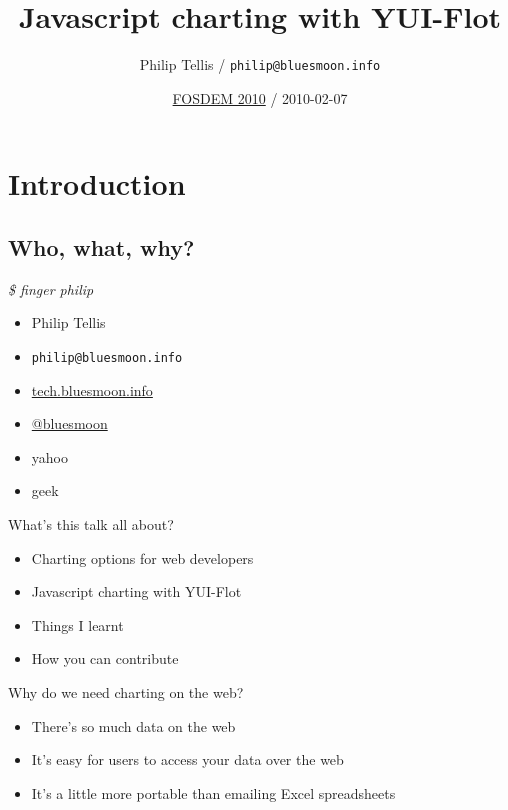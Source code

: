 \documentclass{beamer}
\author{Philip Tellis / \texttt{philip@bluesmoon.info}}
\title{Javascript charting with YUI-Flot}
\date{\href{http://fosdem.org/2010/}{FOSDEM 2010} / 2010-02-07}
\begin{document}
\begin{frame}
  \titlepage
\end{frame}


\section{Introduction}
\subsection{Who, what, why?}

\begin{frame}{\textit{\$ finger philip}}
  \begin{itemize}
  \item Philip Tellis
  \item \small{\texttt{philip@bluesmoon.info}}
  \item \href{http://tech.bluesmoon.info/}{tech.bluesmoon.info}
  \item \href{http://twitter.com/bluesmoon}{@bluesmoon}
  \item yahoo
  \item geek
  \end{itemize}
\end{frame}

\begin{frame}{What's this talk all about?}
  \begin{itemize}
  \item Charting options for web developers
  \item Javascript charting with YUI-Flot
  \item Things I learnt
  \item How you can contribute
  \end{itemize}
\end{frame}

\begin{frame}{Why do we need charting on the web?}
  \begin{itemize}
  \item There's so much data on the web
  \item<2-> It's easy for users to access your data over the web
  \item<3-> It's a little more portable than emailing Excel spreadsheets
  \end{itemize}
\end{frame}
\end{document}
